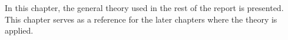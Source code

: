 In this chapter, the general theory used in the rest of the report is presented. This chapter serves as a reference for the later chapters where the theory is applied.